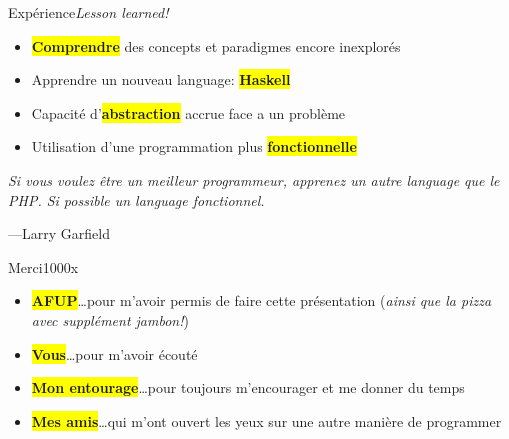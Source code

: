 \begin{frame}{Expérience}{\textit{Lesson learned!}}
    \begin{itemize}[<+->]
        \item \colorbox{yellow}{\textbf{Comprendre}} des concepts et paradigmes encore inexplorés
        \item Apprendre un nouveau language: \colorbox{yellow}{\textbf{Haskell}}
        \item Capacité d'\colorbox{yellow}{\textbf{abstraction}} accrue face a un problème
        \item Utilisation d'une programmation plus \colorbox{yellow}{\textbf{fonctionnelle}}
    \end{itemize}
\end{frame}


\begin{frame}
    \begin{flushleft}
        \textit{
            Si vous voulez être un meilleur programmeur, apprenez un autre language que
            le PHP. Si possible un language fonctionnel.
        }
        \begin{flushright}
            \tiny{---Larry Garfield}
        \end{flushright}
    \end{flushleft}

\end{frame}

\begin{frame}{Merci}{1000x}
    \begin{itemize}[<+->]
        \item \colorbox{yellow}{\textbf{AFUP}}\ldots pour m'avoir permis de faire cette présentation (\textit{ainsi que la pizza avec supplément jambon!})
        \item \colorbox{yellow}{\textbf{Vous}}\ldots pour m'avoir écouté
        \item \colorbox{yellow}{\textbf{Mon entourage}}\ldots pour toujours m'encourager et me donner du temps
        \item \colorbox{yellow}{\textbf{Mes amis}}\ldots qui m'ont ouvert les yeux sur une autre manière de programmer
    \end{itemize}
\end{frame}
